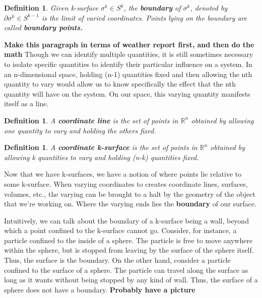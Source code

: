 \documentclass{book}
\newtheorem{defn}[equation]{Definition}
\begin{document}
\begin{defn}
	Given k-surface $\sigma^k \in S^k$, the \textbf{boundary} of $\sigma^k$, denoted by $\partial\sigma^k \in S^{k-1}$ is the limit of varied coordinates. Points lying on the boundary are called \textbf{boundary points.}
\end{defn}

\textbf{Make this paragraph in terms of weather report first, and then do the math}
Though we can identify multiple quantities, it is still sometimes necessary to isolate specific quantities to identify their particular influence on a system. In an n-dimensional space, holding (n-1) quantities fixed and then allowing the nth quantity to vary would allow us to know specifically the effect that the nth quantity will have on the system. On our space, this varying quantity manifests itself as a line. 

\begin{defn}
	A \textbf{coordinate line} is the set of points in $\mathbb{R}^n$ obtained by allowing one quantity to vary and holding the others fixed. 
\end{defn}

\begin{defn}
	A \textbf{coordinate k-surface} is the set of points in $\mathbb{R}^n$ obtained by allowing k quantities to vary and holding (n-k) quantities fixed.  
\end{defn}


Now that we have k-surfaces, we have a notion of where points lie relative to some k-surface. When varying coordinates to creates coordinate lines, surfaces, volumes, etc., the varying can be brought to a halt by the geometry of the object that we're working on. Where the varying ends lies the \textbf{boundary} of our surface. 





Intuitively, we can talk about the boundary of a k-surface being a wall, beyond which a point confined to the k-surface cannot go. Consider, for instance, a particle confined to the inside of a sphere. The particle is free to move anywhere within the sphere, but is stopped from leaving by the surface of the sphere itself. Thus, the surface is the boundary. On the other hand, consider a particle confined to the surface of a sphere. The particle can travel along the surface as long as it wants without being stopped by any kind of wall. Thus, the surface of a sphere does not have a boundary. \textbf{Probably have a picture}
\end{document}
